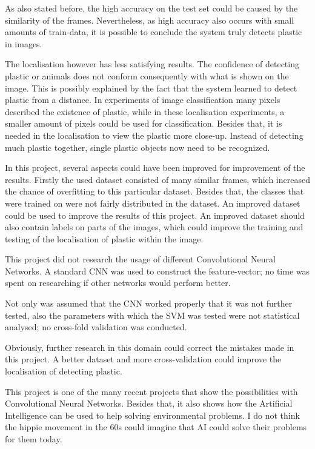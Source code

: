As also stated before, the high accuracy on the test set could be caused by the similarity of the frames.
Nevertheless, as high accuracy also occurs with small amounts of train-data, it is possible to conclude the system truly detects plastic in images.

The localisation however has less satisfying results.
The confidence of detecting plastic or animals does not conform consequently with what is shown on the image.
This is possibly explained by the fact that the system learned to detect plastic from a distance.
In experiments of image classification many pixels described the existence of plastic, while in these localisation experiments, a smaller amount of pixels could be used for classification.
Besides that, it is needed in the localisation to view the plastic more close-up.
Instead of detecting much plastic together, single plastic objects now need to be recognized.

In this project, several aspects could have been improved for improvement of the results.
Firstly the used dataset consisted of many similar frames, which increased the chance of overfitting to this particular dataset.
Besides that, the classes that were trained on were not fairly distributed in the dataset.
An improved dataset could be used to improve the results of this project.
An improved dataset should also contain labels on parts of the images, which could improve the training and testing of the localisation of plastic within the image.

This project did not research the usage of different Convolutional Neural Networks.
A standard CNN was used to construct the feature-vector; no time was spent on researching if other networks would perform better.

Not only was assumed that the CNN worked properly that it was not further tested, also the parameters with which the SVM was tested were not statistical analysed; no cross-fold validation was conducted.




Obviously, further research in this domain could correct the mistakes made in this project.
A better dataset and more cross-validation could improve the localisation of detecting plastic.


This project is one of the many recent projects that show the possibilities with Convolutional Neural Networks.
Besides that, it also shows how the Artificial Intelligence can be used to help solving environmental problems.
I do not think the hippie movement in the 60s could imagine that AI could solve their problems for them today.


